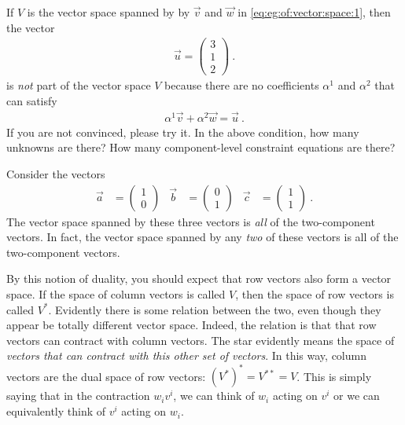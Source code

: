\begin{example}
If $V$ is the vector space spanned by by $\vec{v}$ and $\vec{w}$ in \eqref{eq:eg:of:vector:space:1}, then the vector
\begin{align}
    \vec{u}
    =
    \begin{pmatrix}
        3 \\ 1 \\ 2
    \end{pmatrix} \ .
\end{align}
is \emph{not} part of the vector space $V$ because there are no coefficients $\alpha^1$ and $\alpha^2$ that can satisfy
\begin{align}
    \alpha^1\vec{v} + \alpha^2 \vec{w} = \vec{u} \ .
\end{align}
If you are not convinced, please try it. In the above condition, how many unknowns are there? How many component-level constraint equations are there?
\end{example}

\begin{example}
Consider the vectors
\begin{align}
    \vec{a}
    &=
    \begin{pmatrix}
        1\\0
    \end{pmatrix}
    &
    \vec{b}
    &=
    \begin{pmatrix}
        0\\1
    \end{pmatrix}
    &
    \vec{c}
    &=
    \begin{pmatrix}
        1\\1
    \end{pmatrix}\ .
\end{align}
The vector space spanned by these three vectors is \emph{all} of the two-component vectors. In fact, the vector space spanned by any \emph{two} of these vectors is all of the two-component vectors. 
\end{example}


By this notion of duality, you should expect that row vectors also form a vector space. If the space of column vectors is called $V$, then the space of row vectors is called $V^*$. Evidently there is some relation between the two, even though they appear be totally different vector space. Indeed, the relation is that that row vectors can contract with column vectors. The star evidently means the space of \emph{vectors that can contract with this other set of vectors}. In this way, column vectors are the dual space of row vectors: $(V^*)^* = V^{**} = V$. This is simply saying that in the contraction $w_i v^i$, we can think of $w_i$ acting on $v^i$ or we can equivalently think of $v^i$ acting on $w_i$. 


